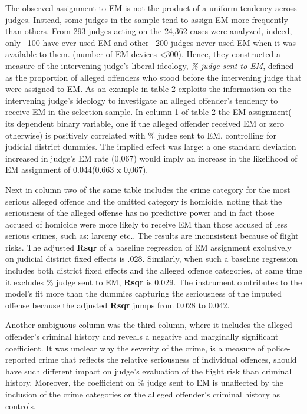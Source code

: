 \documentclass[a4paper,12pt]{article}
\begin{document}
The observed assignment to EM is not the product of a uniform tendency across judges. Instead, some judges in the sample tend to assign EM more frequently than others. From 293 judges acting on the 24,362 cases were analyzed, indeed, only ~100 have ever used EM and other ~200 judges never used EM when it was available to them. (number of EM devices <300). Hence, they constructed a measure of the intervening judge's liberal ideology, \textit{ \% judge sent to EM}, defined as the proportion of alleged offenders who stood before the intervening judge that were assigned to EM. 
As an example in table 2 exploits the information on the intervening judge's ideology to investigate an alleged offender's tendency to receive EM in the selection sample. In column 1 of table 2 the EM assignment( its dependent binary variable, one if the alleged offender received EM or zero otherwise) is positively correlated with \% judge sent to EM, controlling for judicial district dummies. The implied effect was large: a one standard deviation increased in judge's EM rate (0,067) would imply an increase in the likelihood of EM assignment of 0.044(0.663 x 0,067). 

Next in column two of the same table includes the crime category for the most serious alleged offence and the omitted category is homicide, noting that the seriousness of the alleged offense has no predictive power and in fact those accused of homicide were more likely to receive EM than those accused of less serious crimes, such as: larceny etc.. The results are inconsistent because of flight risks. The adjusted \textbf{Rsqr} of a baseline regression of EM assignment exclusively on judicial district fixed effects is .028. Similarly, when such a baseline regression includes both district fixed effects and the alleged offence categories, at same time it excludes \% judge sent to EM, \textbf{Rsqr} is 0.029. The instrument contributes to the model's fit more than the dummies capturing the seriousness of the imputed offense because the adjusted \textbf{Rsqr} jumps from 0.028 to 0.042.  

Another ambiguous column was the third column, where it includes the alleged offender's criminal history and reveals a negative and marginally significant coefficient. It was unclear why the severity of the crime, is a measure of police-reported crime that reflects the relative seriousness of individual offences, should have such different impact on judge's evaluation of the flight risk than criminal history. Moreover, the coefficient on \% judge sent to EM is unaffected by the inclusion of the crime categories or the alleged offender's criminal history as controls. 
\end{document}
